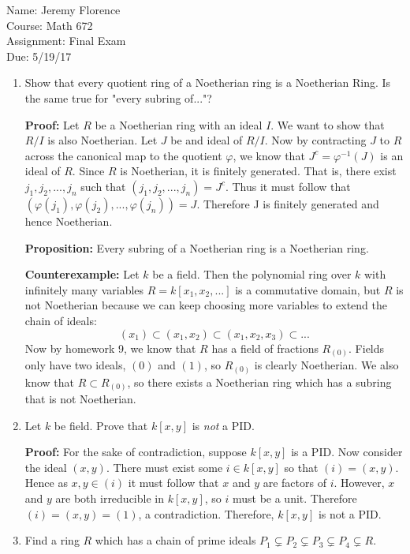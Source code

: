 \documentclass{article}
\newcommand\Proof{%
	\textbf{Proof:} %
}
\begin{document}
Name: Jeremy Florence \\
Course: Math 672 \\
Assignment: Final Exam \\
Due: 5/19/17

\begin{enumerate}
	\item Show that every quotient ring of a Noetherian ring is a Noetherian Ring. Is the same true for "every subring of..."?
	
	\Proof Let $R$ be a Noetherian ring with an ideal $I$. We  want to show that $R/I$ is also Noetherian. Let $J$ be and ideal of $R/I$. Now by contracting $J$ to $R$ across the canonical map to the quotient $\varphi$, we know that $J^c=\varphi^{-1}(J)$ is an ideal of $R$. Since $R$ is Noetherian, it is finitely generated. That is, there exist $j_1, j_2, ... , j_n$ such that $(j_1, j_2, ..., j_n)=J^c$. Thus it must follow that $(\varphi(j_1),\varphi(j_2),...,\varphi(j_n))=J$. Therefore J is finitely generated and hence Noetherian.
	
	\textbf{Proposition:} Every subring of a Noetherian ring is a Noetherian ring.
	
	\textbf{Counterexample:} Let $k$ be a field. Then the polynomial ring over $k$ with infinitely many variables $R=k[x_1,x_2,...]$ is a commutative domain, but $R$ is not Noetherian because we can keep choosing more variables to extend the chain of ideals: $$(x_1) \subset (x_1, x_2) \subset (x_1, x_2, x_3) \subset ...$$ Now by homework 9, we know that $R$ has a field of fractions $R_{(0)}$. Fields only have two ideals, $(0)$ and $(1)$, so $R_{(0)}$ is clearly Noetherian. We also know that $R \subset R_{(0)}$, so there exists a Noetherian ring which has a subring that is not Noetherian.\\
	
	\item Let $k$ be field. Prove that $k[x,y]$ is \emph{not} a PID.
	
	\Proof For the sake of contradiction, suppose $k[x,y]$ is a PID. Now consider the ideal $(x,y)$. There must exist some $i \in k[x,y]$ so that $(i)=(x,y)$. Hence as $x,y \in (i)$ it must follow that $x$ and $y$ are factors of $i$. However, $x$ and $y$ are both irreducible in $k[x,y]$, so $i$ must be a unit. Therefore $(i)=(x,y)=(1)$, a contradiction. Therefore, $k[x,y]$ is not a PID.\\
	
	\item Find a ring $R$ which has a chain of prime ideals $P_1 \subsetneq P_2 \subsetneq P_3 \subsetneq P_4 \subsetneq R$.
	

\end{enumerate}
\end{document}
